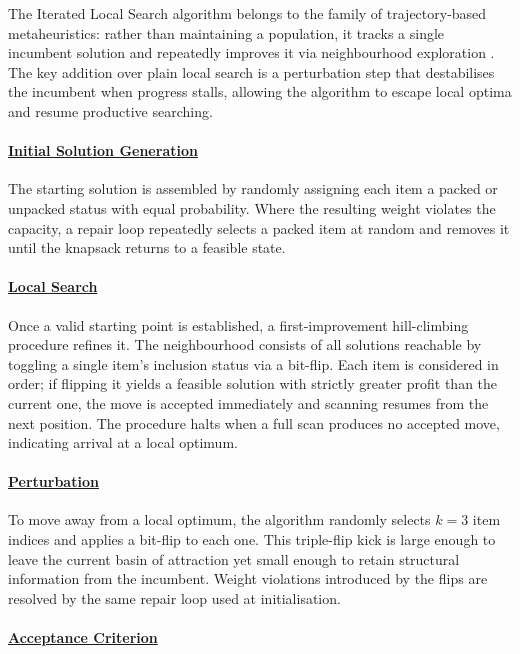 \documentclass[12pt, a4paper]{article}
\begin{document}
The Iterated Local Search algorithm belongs to the family of trajectory-based metaheuristics: rather than maintaining a population, it tracks a single incumbent solution and repeatedly improves it via neighbourhood exploration \cite{nyathi2025}. The key addition over plain local search is a perturbation step that destabilises the incumbent when progress stalls, allowing the algorithm to escape local optima and resume productive searching.

\paragraph*{\underline{Initial Solution Generation}}

The starting solution is assembled by randomly assigning each item a packed or unpacked status with equal probability. Where the resulting weight violates the capacity, a repair loop repeatedly selects a packed item at random and removes it until the knapsack returns to a feasible state.

\paragraph*{\underline{Local Search}}

Once a valid starting point is established, a first-improvement hill-climbing procedure refines it. The neighbourhood consists of all solutions reachable by toggling a single item's inclusion status via a bit-flip. Each item is considered in order; if flipping it yields a feasible solution with strictly greater profit than the current one, the move is accepted immediately and scanning resumes from the next position. The procedure halts when a full scan produces no accepted move, indicating arrival at a local optimum.

\paragraph*{\underline{Perturbation}}

To move away from a local optimum, the algorithm randomly selects $k = 3$ item indices and applies a bit-flip to each one. This triple-flip kick is large enough to leave the current basin of attraction yet small enough to retain structural information from the incumbent. Weight violations introduced by the flips are resolved by the same repair loop used at initialisation.

\paragraph*{\underline{Acceptance Criterion}}
\end{document}
